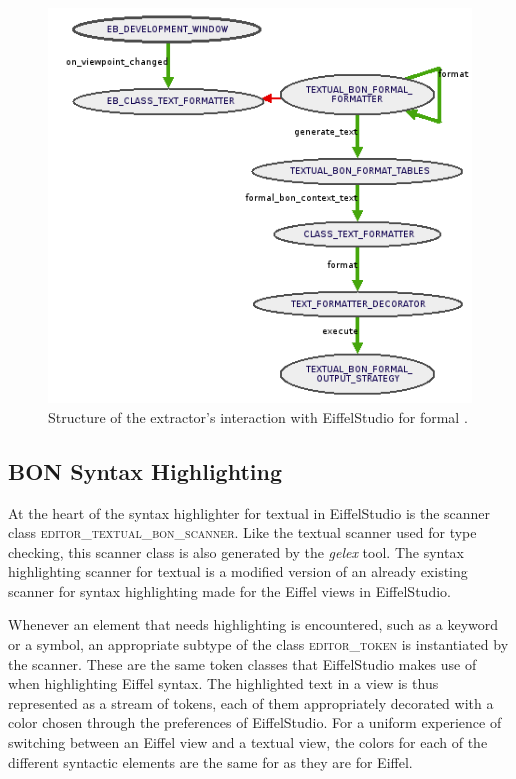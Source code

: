 \begin{figure}[H]
\centerline{
\includegraphics[scale=0.7]{images/BON-extractor-structure-large.png}
}
\caption{Structure of the \bon{} extractor's interaction with EiffelStudio for formal \bon.}
\label{fig:extractor_structure}
\end{figure}

\subsection{BON Syntax Highlighting}
At the heart of the syntax highlighter for textual \bon{} in EiffelStudio is the scanner class \textsc{editor\_textual\_bon\_scanner}. Like the textual \bon{} scanner used for type checking, this scanner class is also generated by the \textit{gelex} tool. The syntax highlighting scanner for textual \bon{} is a modified version of an already existing scanner for syntax highlighting made for the Eiffel views in EiffelStudio. 

Whenever an element that needs highlighting is encountered, such as a keyword or a symbol, an appropriate subtype of the class \textsc{editor\_token} is instantiated by the scanner. These are the same token classes that EiffelStudio makes use of when highlighting Eiffel syntax. The highlighted text in a view is thus represented as a stream of tokens, each of them appropriately decorated with a color chosen through the preferences of EiffelStudio. For a uniform experience of switching between an Eiffel view and a textual \bon{} view, the colors for each of the different syntactic elements are the same for \bon{} as they are for Eiffel.

